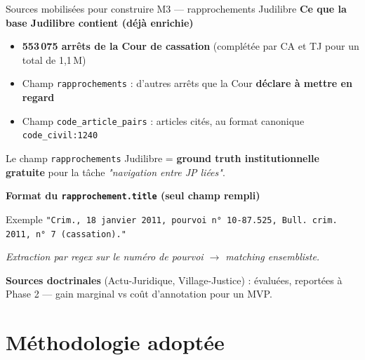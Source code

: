 \documentclass[aspectratio=169,10pt]{beamer}
\newcommand{\keybox}[1]{%
  \begin{center}
  \colorbox{accentsoft}{\parbox{0.92\linewidth}{\centering #1}}
  \end{center}}
\begin{document}
\begin{frame}{Sources mobilisées pour construire M3 --- rapprochements Judilibre}
  \textbf{Ce que la base Judilibre contient (déjà enrichie)}
  \begin{itemize}\footnotesize
    \item \textbf{553\,075 arrêts de la Cour de cassation} (complétée par CA et TJ pour un total de 1{,}1\,M)
    \item Champ \texttt{rapprochements} : d'autres arrêts que la Cour \textbf{déclare à mettre en regard}
    \item Champ \texttt{code\_article\_pairs} : articles cités, au format canonique \texttt{code\_civil:1240}
  \end{itemize}

  \vspace{0.3em}
  \keybox{\small Le champ \texttt{rapprochements} Judilibre = \textbf{ground truth institutionnelle gratuite} pour la tâche \textit{"navigation entre JP liées"}.}

  \vspace{0.3em}
  \textbf{Format du \texttt{rapprochement.title} (seul champ rempli)}
  \begin{block}{\scriptsize Exemple}
    \scriptsize\texttt{"Crim., 18 janvier 2011, pourvoi n° 10-87.525, Bull. crim. 2011, n° 7 (cassation)."}
  \end{block}
  \footnotesize\textit{Extraction par regex sur le numéro de pourvoi $\rightarrow$ matching ensembliste.}

  \vspace{0.3em}
  \textbf{Sources doctrinales} (Actu-Juridique, Village-Justice) : évaluées, reportées à Phase 2 --- gain marginal vs coût d'annotation pour un MVP.
\end{frame}

\section{Méthodologie adoptée}
\end{document}

